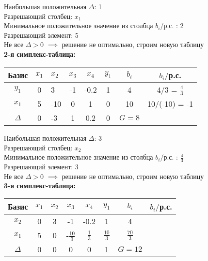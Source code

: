 \begin{flushleft}
    Наибольшая положительная $\Delta$: 1\\
    Разрешающий столбец: $x_1$\\
    Минимальное положительное значение из столбца $b_i$/р.с. : 2\\
    Разрешающий элемент: 5\\
    Не все $\Delta > 0$ $\implies$ решение не оптимально, строим новую таблицу\\
    {\bf2-я симплекс-таблица:}\\
\end{flushleft}

\begin{center}
    \begin{tabular}{|c | c g c c c c c|} 
         \hline
            Базис & $x_1$ & $x_2$ & $x_3$ & $x_4$ & $y_1$ & $b_i$ & $b_i/$р.с.\\
         \hline
            $y_1$ & 0 & 3 & -1 & -0.2 & 1 & 4 & 4/3 = $\frac{4}{3}$\\
         \hline
            $x_1$ & 5 & -10 & 0 & 1 & 0 & 10 & 10/(-10) = -1\\
         \hline
            $\Delta$ & 0 & -3 & 1 & 0.2 & 0 & $G = 8$ &\\
         \hline
    \end{tabular}
\end{center}

\begin{flushleft}
    Наибольшая положительная $\Delta$: 3\\
    Разрешающий столбец: $x_2$\\
    Минимальное положительное значение из столбца $b_i$/р.с. : $\frac{4}{3}$\\
    Разрешающий элемент: 3\\
    Не все $\Delta > 0$ $\implies$ решение не оптимально, строим новую таблицу\\
    {\bf3-я симплекс-таблица:}\\
\end{flushleft}

\begin{center}
    \begin{tabular}{|c | c c c c c c c|} 
         \hline
            Базис & $x_1$ & $x_2$ & $x_3$ & $x_4$ & $y_1$ & $b_i$ & $b_i/$р.с.\\
         \hline
            $x_2$ & 0 & 3 & -1 & -0.2 & 1 & 4 &\\
         \hline
            $x_1$ & 5 & 0 & -$\frac{10}{3}$ & $\frac{1}{3}$ & $\frac{10}{3}$ & $\frac{70}{3}$ &\\
         \hline
            $\Delta$ & 0 & 0 & 0 & 0 & 1 & $G = 12$ &\\
         \hline
    \end{tabular}
\end{center}

